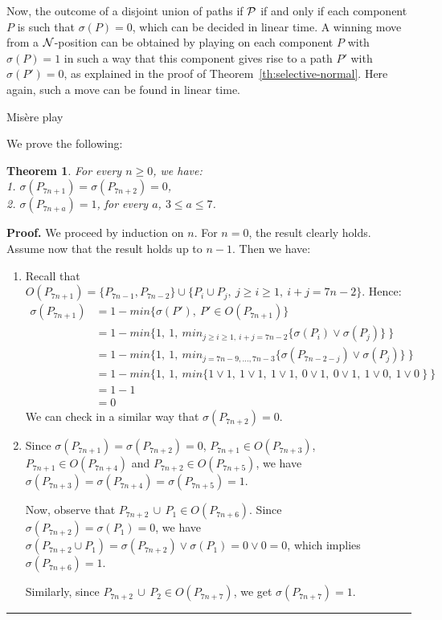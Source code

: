 \documentclass[11pt]{article}
\newcommand{\centre}[1]{\begin{center}#1\end{center}}
\newcommand{\NN}{{\cal N}}
\newcommand{\PP}{{\cal P}}
\newtheorem{theorem}{Theorem}
\newcommand\qed{\mbox{}\hfill\rule{0.5em}{0.809em}\par\vskip 5mm}
\newenvironment{proof}[0]{\noindent\textbf{Proof.}}{\qed}
\begin{document}
Now, the outcome of a disjoint union of paths if $\PP$
if and only if each component $P$ is such that $\sigma(P)=0$,
which can be decided in linear time.
A winning move from a $\NN$-position can be obtained by playing
on each component $P$ with $\sigma(P)=1$ in such a way that
this component gives rise to a path $P'$ with $\sigma(P')=0$,
as explained in the proof of Theorem~\ref{th:selective-normal}.
Here again, such a move can be found in linear time.

\vskip 4mm

\centre{{\sc Mis\`ere play}}

We prove the following:

\begin{theorem} 
For every $n\geq 0$, we have:\\
1. $\sigma(P_{7n+1})=\sigma(P_{7n+2})=0$,\\
2. $\sigma(P_{7n+a})=1$, for every $a$, $3\le a\le 7$.
\end{theorem}

\begin{proof}
We proceed by induction on $n$.
For $n=0$, the result clearly holds.
Assume now that the result holds up to $n-1$. Then we have:

\begin{enumerate}

\item 
Recall that 
$O(P_{7n+1})=\{ P_{7n-1},P_{7n-2}\}\cup\{P_i\cup P_j,\
j\ge i\ge 1,\ i+j=7n-2\}$. Hence:
$$\begin{array}{rl}
\sigma(P_{7n+1}) & = 1 - min\{\sigma(P'),\ P'\in O(P_{7n+1})\} \\
 & = 1 - min\{1,\ 1,\ min_{j\ge i\ge 1,\ i+j=7n-2}\{\sigma(P_i)\vee\sigma(P_j)\}\ \} \\
 & = 1 - min\{1,\ 1,\ min_{j=7n-9,\dots,7n-3}\{\sigma(P_{7n-2-j})\vee\sigma(P_j)\}\ \} \\
 & = 1 - min\{1,\ 1,\ min\{1\vee 1,\ 1\vee 1,\ 1\vee 1,\ 0\vee 1,\
                0\vee 1,\ 1\vee 0,\ 1\vee 0\  \}\ \} \\
 & = 1 - 1 \\
 & = 0
\end{array}$$
We can check in a similar way that $\sigma(P_{7n+2})=0$.

\item 
Since $\sigma(P_{7n+1})=\sigma(P_{7n+2})=0$,
$P_{7n+1}\in O(P_{7n+3})$, 
$P_{7n+1}\in O(P_{7n+4})$ and
$P_{7n+2}\in O(P_{7n+5})$, 
we have $\sigma(P_{7n+3})=\sigma(P_{7n+4})=\sigma(P_{7n+5})=1$.

Now, observe that $P_{7n+2}\,\cup\, P_1\in O(P_{7n+6})$. Since 
$\sigma(P_{7n+2})=\sigma(P_1)=0$,
we have $\sigma(P_{7n+2}\cup P_1)=
\sigma(P_{7n+2})\vee\sigma(P_1)=0\vee 0=0$, which implies
$\sigma(P_{7n+6})=1$.

Similarly, since $P_{7n+2}\,\cup\, P_2\in O(P_{7n+7})$, we get
$\sigma(P_{7n+7})=1$.

\end{enumerate}
\end{proof}
\end{document}

